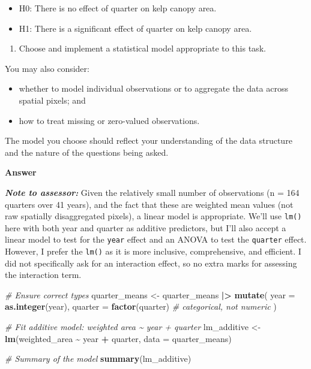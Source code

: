 \documentclass[
  british,
  10pt,
]{article}
\newenvironment{Shaded}{\begin{snugshade}}{\end{snugshade}}
\newcommand{\AttributeTok}[1]{\textcolor[rgb]{0.13,0.29,0.53}{#1}}
\newcommand{\CommentTok}[1]{\textcolor[rgb]{0.56,0.35,0.01}{\textit{#1}}}
\newcommand{\FunctionTok}[1]{\textcolor[rgb]{0.13,0.29,0.53}{\textbf{#1}}}
\newcommand{\NormalTok}[1]{#1}
\newcommand{\OtherTok}[1]{\textcolor[rgb]{0.56,0.35,0.01}{#1}}
\newcommand{\SpecialCharTok}[1]{\textcolor[rgb]{0.81,0.36,0.00}{\textbf{#1}}}
\providecommand{\tightlist}{%
  \setlength{\itemsep}{0pt}\setlength{\parskip}{0pt}}
\let\oldtexttt\texttt
\renewcommand{\texttt}[1]{\oldtexttt{\small #1}}
\begin{document}
\begin{itemize}
\tightlist
\item
  H0: There is no effect of quarter on kelp canopy area.
\item
  H1: There is a significant effect of quarter on kelp canopy area.
\end{itemize}

\begin{enumerate}
\def\labelenumi{\arabic{enumi}.}
\setcounter{enumi}{1}
\tightlist
\item
  Choose and implement a statistical model appropriate to this task.
\end{enumerate}

You may also consider:

\begin{itemize}
\tightlist
\item
  whether to model individual observations or to aggregate the data
  across spatial pixels; and
\item
  how to treat missing or zero-valued observations.
\end{itemize}

The model you choose should reflect your understanding of the data
structure and the nature of the questions being asked.

\textbf{Answer}

\textbf{\emph{Note to assessor:}} Given the relatively small number of
observations (n = 164 quarters over 41 years), and the fact that these
are weighted mean values (not raw spatially disaggregated pixels), a
linear model is appropriate. We'll use \texttt{lm()} here with both year
and quarter as additive predictors, but I'll also accept a linear model
to test for the \texttt{year} effect and an ANOVA to test the
\texttt{quarter} effect. However, I prefer the \texttt{lm()} as it is
more inclusive, comprehensive, and efficient. I did not specifically ask
for an interaction effect, so no extra marks for assessing the
interaction term.

\begin{Shaded}
\begin{Highlighting}[]
\CommentTok{\# Ensure correct types}
\NormalTok{quarter\_means }\OtherTok{\textless{}{-}}\NormalTok{ quarter\_means }\SpecialCharTok{|\textgreater{}} 
  \FunctionTok{mutate}\NormalTok{(}
    \AttributeTok{year =} \FunctionTok{as.integer}\NormalTok{(year),}
    \AttributeTok{quarter =} \FunctionTok{factor}\NormalTok{(quarter) }\CommentTok{\# categorical, not numeric}
\NormalTok{  )}

\CommentTok{\# Fit additive model: weighted area \textasciitilde{} year + quarter}
\NormalTok{lm\_additive }\OtherTok{\textless{}{-}} \FunctionTok{lm}\NormalTok{(weighted\_area }\SpecialCharTok{\textasciitilde{}}\NormalTok{ year }\SpecialCharTok{+}\NormalTok{ quarter, }\AttributeTok{data =}\NormalTok{ quarter\_means)}

\CommentTok{\# Summary of the model}
\FunctionTok{summary}\NormalTok{(lm\_additive)}
\end{Highlighting}
\end{Shaded}
\end{document}
